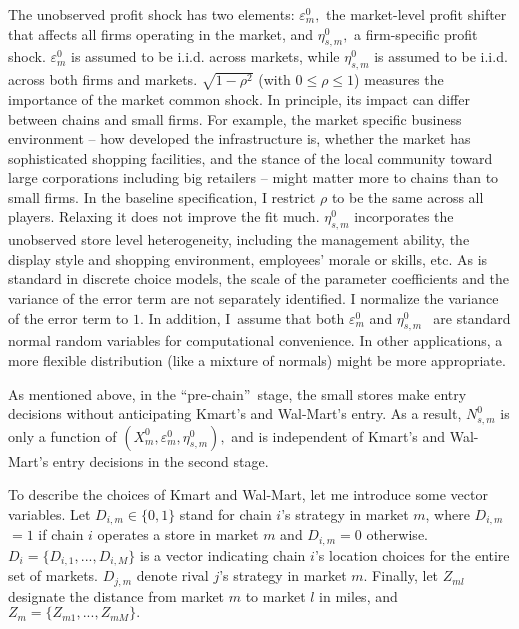 \documentclass[notitlepage,onecolumn,11pt]{article}
\begin{document}
The unobserved profit shock has two elements: $\varepsilon _{m}^{0},$ the
market-level profit shifter that affects all firms operating in the market,
and $\eta _{s,m}^{0},$ a firm-specific profit shock. $\varepsilon _{m}^{0}$
is assumed to be i.i.d. across markets, while $\eta _{s,m}^{0}$ is assumed
to be i.i.d. across both firms and markets. $\sqrt{1-\rho ^{2}}$ (with $%
0\leq \rho \leq 1$) measures the importance of the market common shock. In
principle, its impact can differ between chains and small firms. For
example, the market specific business environment -- how developed the
infrastructure is, whether the market has sophisticated shopping facilities,
and the stance of the local community toward large corporations including
big retailers -- might matter more to chains than to small firms. In the
baseline specification, I restrict $\rho $ to be the same across all
players. Relaxing it does not improve the fit much. $\eta _{s,m}^{0}$
incorporates the unobserved store level heterogeneity, including the
management ability, the display style and shopping environment, employees'
morale or skills, etc. As is standard in discrete choice models, the scale
of the parameter coefficients and the variance of the error term are not
separately identified. I normalize the variance of the error term to $1.$ In
addition, I\ assume that both $\varepsilon _{m}^{0}$ and $\eta _{s,m\text{ }%
}^{0}$ are standard normal random variables for computational convenience.
In other applications, a more flexible distribution (like a mixture of
normals) might be more appropriate.

As mentioned above, in the \textquotedblleft pre-chain\textquotedblright\
stage, the small stores make entry decisions without anticipating Kmart's
and Wal-Mart's entry. As a result, $N_{s,m}^{0}$ is only a function of $%
(X_{m}^{0},\varepsilon _{m}^{0},\eta _{s,m}^{0}),$ and is independent of
Kmart's and Wal-Mart's entry decisions in the second stage.

To describe the choices of Kmart and Wal-Mart, let me introduce some vector
variables. Let $D_{i,m}\in \{0,1\}$ stand for chain $i$'s strategy in market 
$m$, where $D_{i,m}$ $=1$ if chain $i$ operates a store in market $m$ and $%
D_{i,m}=0$ otherwise. $D_{i}=\{D_{i,1},...,D_{i,M}\}$ is a vector indicating
chain $i$'s location choices for the entire set of markets. $D_{j,m}$ denote
rival $j$'s strategy in market $m$. Finally, let $Z_{ml}$ designate the
distance from market $m$ to market $l$ in miles, and $Z_{m}=%
\{Z_{m1},...,Z_{mM}\}.$
\end{document}
